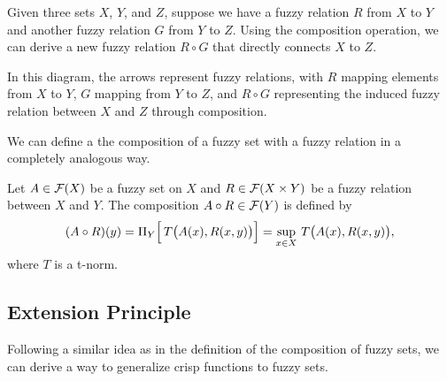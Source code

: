 

Given three sets \(X\), \(Y\), and \(Z\), suppose we have a fuzzy relation \(R\) from \(X\) to \(Y\) and another fuzzy relation \(G\) from \(Y\) to \(Z\). Using the composition operation, we can derive a new fuzzy relation \(R \circ G\) that directly connects \(X\) to \(Z\).

\noindent
\begin{minipage}{0.7\textwidth}
In this diagram, the arrows represent fuzzy relations, with \(R\) mapping elements from \(X\) to \(Y\), \(G\) mapping from \(Y\) to \(Z\), and \(R \circ G\) representing the induced fuzzy relation between \(X\) and \(Z\) through composition.\\
\end{minipage}%
\begin{minipage}{0.3\textwidth}
  \begin{center}
  \end{center}

\end{minipage}


We can define a the composition of a fuzzy set with a fuzzy relation in a completely analogous way. 

\begin{definition}
    Let \( A \in \mathcal{F}(X) \) be a fuzzy set on \(X\) and \( R \in \mathcal{F}(X \times Y) \) be a fuzzy relation between \(X\) and \(Y\). The composition \( A \circ R \in \mathcal{F}(Y) \) is defined by
    \[
    (A \circ R)(y) = \Pi_{Y}\Bigl[\, T\bigl( A(x), R(x,y) \bigr) \Bigr] = \sup_{x \in X}\, T\bigl( A(x), R(x,y) \bigr),
    \]
    where \(T\) is a t-norm.
\end{definition}

\subsection{Extension Principle}
\label{sec:ext_pple}

Following a similar idea as in the definition of the composition of fuzzy sets, we can derive a way to generalize crisp functions to fuzzy sets.\\

